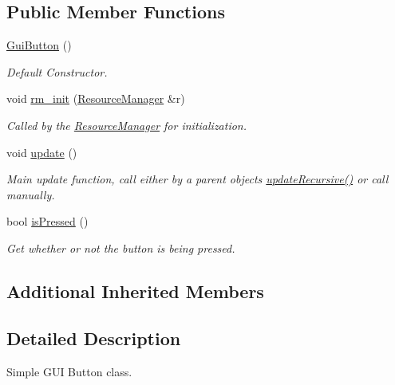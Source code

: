 \subsection*{Public Member Functions}
\begin{DoxyCompactItemize}
\item 
\mbox{\label{class_gui_button_a4c33541a08894c3f742ee5ea03127152}} 
\mbox{\hyperlink{class_gui_button_a4c33541a08894c3f742ee5ea03127152}{Gui\+Button}} ()
\begin{DoxyCompactList}\small\item\em Default Constructor. \end{DoxyCompactList}\item 
void \mbox{\hyperlink{class_gui_button_ac5890862aa1f104f615f5c2c2ee80dfc}{rm\+\_\+init}} (\mbox{\hyperlink{class_resource_manager}{Resource\+Manager}} \&r)
\begin{DoxyCompactList}\small\item\em Called by the \mbox{\hyperlink{class_resource_manager}{Resource\+Manager}} for initialization. \end{DoxyCompactList}\item 
\mbox{\label{class_gui_button_afd7f69faf6201309727bce6ff9d04f56}} 
void \mbox{\hyperlink{class_gui_button_afd7f69faf6201309727bce6ff9d04f56}{update}} ()
\begin{DoxyCompactList}\small\item\em Main update function, call either by a parent object\textquotesingle{}s \mbox{\hyperlink{class_gui_component_ac58e20a01f67cf605b069ef853dfab66}{update\+Recursive()}} or call manually. \end{DoxyCompactList}\item 
bool \mbox{\hyperlink{class_gui_button_a8abf4f0d2ffebe67206446947d22c865}{is\+Pressed}} ()
\begin{DoxyCompactList}\small\item\em Get whether or not the button is being pressed. \end{DoxyCompactList}\end{DoxyCompactItemize}
\subsection*{Additional Inherited Members}


\subsection{Detailed Description}
Simple G\+UI Button class. 

